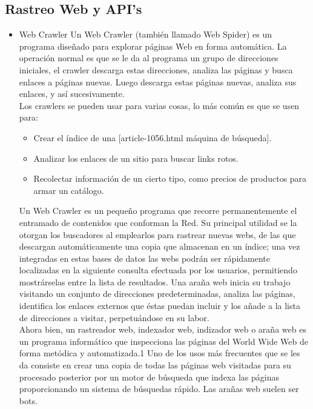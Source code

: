	\subsection{Rastreo Web y API's}
	\begin{itemize}
		\item Web Crawler\newline
			Un Web Crawler (también llamado Web Spider) es un programa diseñado para explorar páginas Web en forma automática. La operación normal es que se le da al programa un grupo de direcciones iniciales, el crawler descarga estas direcciones, analiza las páginas y busca enlaces a páginas nuevas. Luego descarga estas páginas nuevas, analiza sus enlaces, y así sucesivamente.\cite{crawling} \\
			Los crawlers se pueden usar para varias cosas, lo más común es que se usen para:
				\begin{itemize}
					\item Crear el índice de una [article-1056.html máquina de búsqueda]. 
					\item Analizar los enlaces de un sitio para buscar links rotos. 
					\item Recolectar información de un cierto tipo, como precios de productos para armar un catálogo. \cite{craw}
				\end{itemize} 
			
			Un Web Crawler es un pequeño programa que recorre permanentemente el entramado de contenidos que conforman la Red. Su principal utilidad se la otorgan los buscadores al emplearlos para rastrear nuevas webs, de las que descargan automáticamente una copia que almacenan en un índice; una vez integradas en estas bases de datos las webs podrán ser rápidamente localizadas en la siguiente consulta efectuada por los usuarios, permitiendo mostrárselas entre la lista de resultados.
			Una araña web inicia su trabajo visitando un conjunto de direcciones predeterminadas, analiza las páginas, identifica los enlaces externos que éstas puedan incluir y los añade a la lista de direcciones a visitar, perpetuándose en su labor.	\cite{web} \\
			
			Ahora bien, un rastreador web, indexador web, indizador web o araña web es un programa informático que inspecciona las páginas del World Wide Web de forma metódica y automatizada.1 Uno de los usos más frecuentes que se les da consiste en crear una copia de todas las páginas web visitadas para su procesado posterior por un motor de búsqueda que indexa las páginas proporcionando un sistema de búsquedas rápido. Las arañas web suelen ser bots. \cite{araña} \\
			

\end{itemize}
